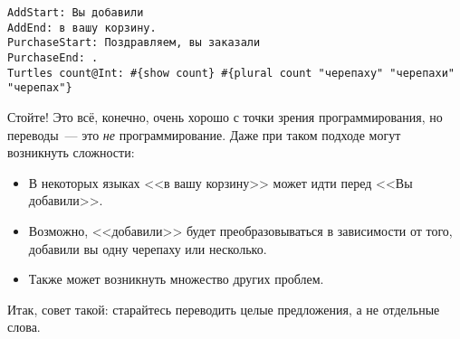\begin{lstlisting}
AddStart: Вы добавили
AddEnd: в вашу корзину.
PurchaseStart: Поздравляем, вы заказали
PurchaseEnd: .
Turtles count@Int: #{show count} #{plural count "черепаху" "черепахи" "черепах"}
\end{lstlisting}

Стойте! Это всё, конечно, очень хорошо с точки зрения программирования, но
переводы~--- это \emph{не} программирование. Даже при таком подходе могут
возникнуть сложности:

\begin{itemize}
  \item В некоторых языках <<в вашу корзину>> может идти перед <<Вы добавили>>.

  \item Возможно, <<добавили>> будет преобразовываться в зависимости от того,
      добавили вы одну черепаху или несколько.

  \item Также может возникнуть множество других проблем.
\end{itemize}

Итак, совет такой: старайтесь переводить целые предложения, а не отдельные
слова.
